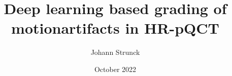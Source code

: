 \documentclass[acmsmall, review]{acmart}
\title{Deep learning based grading of motionartifacts in HR-pQCT}
\date{October 2022}
\author{Johann Strunck}
\begin{document}
\begin{abstract}
	
\end{abstract}
	\maketitle
\end{document}
